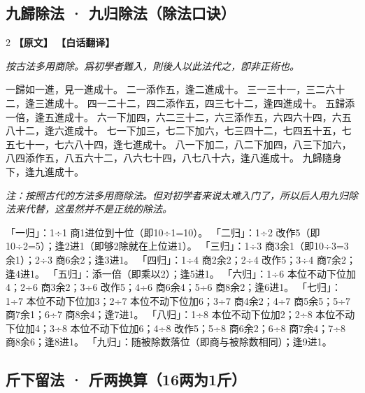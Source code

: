 \documentclass[11pt,a4paper]{article}
\begin{document}
\medskip

\subsection{九歸除法 · 九归除法（除法口诀）}

\begin{paracol}{2}
\noindent\textbf{\textcolor{leftlabel}{【原文】}}
\switchcolumn
\noindent\textbf{\textcolor{rightlabel}{【白话翻译】}}
\switchcolumn*

\textit{按古法多用商除。爲初學者難入，則後人以此法代之，卽非正術也。}

\medskip

一歸如一進，見一進成十。\break
二一添作五，逢二進成十。\break
三一三十一，三二六十二，逢三進成十。\break
四一二十二，四二添作五，四三七十二，逢四進成十。\break
五歸添一倍，逢五進成十。\break
六一下加四，六二三十二，六三添作五，六四六十四，六五八十二，逢六進成十。\break
七一下加三，七二下加六，七三四十二，七四五十五，七五七十一，七六八十四，逢七進成十。\break
八一下加二，八二下加四，八三下加六，八四添作五，八五六十二，八六七十四，八七八十六，逢八進成十。\break
九歸隨身下，逢九進成十。

\switchcolumn

\textit{注：按照古代的方法多用商除法。但对初学者来说太难入门了，所以后人用九归除法来代替，这虽然并不是正统的除法。}

\medskip

「一归」：1÷1 商1进位到十位（即10÷1=10）。\break
「二归」：1÷2 改作5（即10÷2=5）；逢2进1（即够2除就在上位进1）。\break
「三归」：1÷3 商3余1（即10÷3=3余1）；2÷3 商6余2；逢3进1。\break
「四归」：1÷4 商2余2；2÷4 改作5；3÷4 商7余2；逢4进1。\break
「五归」：添一倍（即乘以2）；逢5进1。\break
「六归」：1÷6 本位不动下位加4；2÷6 商3余2；3÷6 改作5；4÷6 商6余4；5÷6 商8余2；逢6进1。\break
「七归」：1÷7 本位不动下位加3；2÷7 本位不动下位加6；3÷7 商4余2；4÷7 商5余5；5÷7 商7余1；6÷7 商8余4；逢7进1。\break
「八归」：1÷8 本位不动下位加2；2÷8 本位不动下位加4；3÷8 本位不动下位加6；4÷8 改作5；5÷8 商6余2；6÷8 商7余4；7÷8 商8余6；逢8进1。\break
「九归」：随被除数落位（即商与被除数相同）；逢9进1。

\end{paracol}

\medskip

\subsection{斤下留法 · 斤两换算（16两为1斤）}
\end{document}
